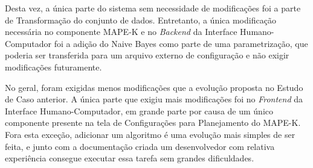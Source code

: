 \documentclass[twocolumn]{article}
\begin{document}
\begin{table}[H]
\begin{center}
  \caption{Quantidade de modificações realizadas ao adicionar um novo algoritmo ao \textit{Workflow}}
\label{tbl:ManutencaoPipelineCaso3}
\end{center}
\end{table}

Desta vez, a única parte do sistema sem necessidade de modificações foi a parte de Transformação do conjunto de dados. Entretanto, a única modificação necessária no componente MAPE-K e no \textit{Backend} da Interface Humano-Computador foi a adição do Naive Bayes como parte de uma parametrização, que poderia ser transferida para um arquivo externo de configuração e não exigir modificações futuramente.

No geral, foram exigidas menos modificações que a evolução proposta no Estudo de Caso anterior. A única parte que exigiu mais modificações foi no \textit{Frontend} da Interface Humano-Computador, em grande parte por causa de um único componente presente na tela de Configurações para Planejamento do MAPE-K. Fora esta exceção, adicionar um algoritmo é uma evolução mais simples de ser feita, e junto com a documentação criada um desenvolvedor com relativa experiência consegue executar essa tarefa sem grandes dificuldades.
\end{document}
